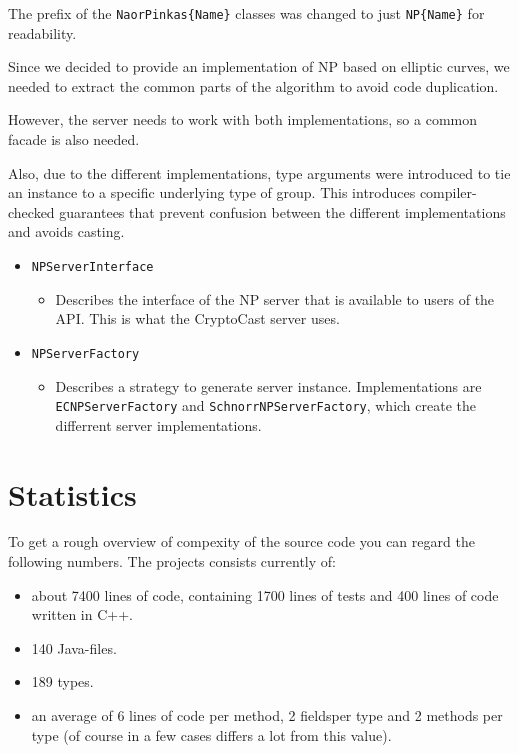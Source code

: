 \documentclass[a4paper,10pt]{scrartcl}
\begin{document}
The prefix of the \lstinline|NaorPinkas{Name}| classes was changed to just \lstinline|NP{Name}| for readability.

Since we decided to provide an implementation of NP based on elliptic curves, we needed to extract
the common parts of the algorithm to avoid code duplication.

However, the server needs to work with both implementations, so a common facade is also needed.

Also, due to the different implementations, type arguments were introduced to tie an instance
to a specific underlying type of group. This introduces compiler-checked guarantees that prevent
confusion between the different implementations and avoids casting.

\begin{itemize}
  \item \lstinline|NPServerInterface|
  \begin{itemize}
    \item Describes the interface of the NP server that is available to users of the API.
          This is what the CryptoCast server uses.
  \end{itemize}

  \item \lstinline|NPServerFactory|
  \begin{itemize}
    \item Describes a strategy to generate server instance. Implementations are
          \lstinline|ECNPServerFactory| and \lstinline|SchnorrNPServerFactory|, which
          create the differrent server implementations.
  \end{itemize}
\end{itemize}

\section{Statistics}
To get a rough overview of compexity of the source code you can regard the following numbers.
The projects consists currently of:
\begin{itemize}
    \item  about 7400 lines of code, containing 1700 lines of tests and 400 lines of code written in C++.
    \item 140 Java-files.
    \item 189 types.
    \item an average of 6 lines of code per method, 2 fieldsper type and 2 methods per type (of course in a few cases differs a lot from this value).
\end{itemize}
\end{document}
